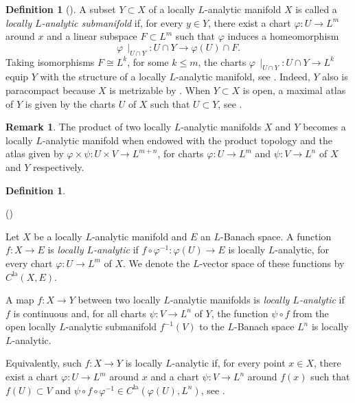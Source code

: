 \documentclass[a4paper, reqno, 10pt]{amsart}
\theoremstyle{definition}
\newtheorem{definition}[theorem]{Definition}
\newtheorem{remark}[theorem]{Remark}
\newenvironment{altenumerate}
	{\begin{list}
		{\textup{(\theenumi)} }
		{\usecounter{enumi}
			\setlength{\labelwidth}{0pt}
			\setlength{\labelsep}{0pt}
			\setlength{\leftmargin}{0pt}
			\setlength{\itemsep}{0pt}
			\setlength{\topsep}{0pt}
		\renewcommand{\theenumi}{\roman{enumi}}
		}}
	{\end{list}}
\numberwithin{equation}{section}
\newcommand{\la}{{\mathrm{la}}}
\newcommand{\lra}{\longrightarrow}
\newcommand{\ra}{\rightarrow}
\newcommand{\res}[1]{{\!\,\mid_{#1}}}
\begin{document}
\begin{definition}[{\cite[5.8.3]{Bourbaki07VarDiffAnFasciDeResult}}]\label{Def 1 - Submanifolds}
	A subset $Y \subset X$ of a locally $L$-analytic manifold $X$ is called a \textit{locally $L$-analytic submanifold} if, for every $y\in Y$, there exist a chart $\varphi \colon U \ra L^m$ around $x$ and a linear subspace $F \subset L^m$ such that $\varphi$ induces a homeomorphism 
	\begin{equation*}
		\varphi\res{U\cap Y} \colon U \cap Y \lra \varphi(U) \cap F.
	\end{equation*}
	Taking isomorphisms $F \cong L^k$, for some $k\leq m$, the charts $\varphi\res{U\cap Y} \colon U \cap Y \ra L^k$ equip $Y$ with the structure of a locally $L$-analytic manifold, see \cite[5.8.1]{Bourbaki07VarDiffAnFasciDeResult}.
	Indeed, $Y$ also is paracompact because $X$ is metrizable by \cite[Prop.\ 8.7]{Schneider11pAdicLieGrps}.
	When $Y \subset X$ is open, a maximal atlas of $Y$ is given by the charts $U$ of $X$ such that $U \subset Y$, see \cite[p.\ 48]{Schneider11pAdicLieGrps}.
\end{definition}



\begin{remark}
	The product of two locally $L$-analytic manifolds $X$ and $Y$ becomes a locally $L$-analytic manifold when endowed with the product topology and the atlas given by $\varphi \times \psi \colon U \times V \ra L^{m+n}$, for charts $\varphi\colon U \ra L^m$ and $\psi \colon V \ra L^n$ of $X$ and $Y$ respectively.
\end{remark}




\begin{definition}\label{Def 1 - Locally analytic maps between locally analytic manifolds}
	\begin{altenumerate}
		\item
		Let $X$ be a locally $L$-analytic manifold and $E$ an $L$-Banach space.
		A function $f\colon X \ra E$ is \textit{locally $L$-analytic} if $f\circ \varphi^{-1}\colon \varphi(U)\ra E$ is locally $L$-analytic, for every chart $\varphi\colon U \ra L^m$ of $X$.
		We denote the $L$-vector space of these functions by $C^\la(X,E)$.
		\item
		A map $f\colon X \ra Y$ between two locally $L$-analytic manifolds is \textit{locally $L$-analytic} if $f$ is continuous and, for all charts $\psi\colon V \ra L^n$ of $Y$, the function $\psi\circ f$ from the open locally $L$-analytic submanifold $f^{-1}(V)$ to the $L$-Banach space $L^n$ is locally $L$-analytic.
		
		Equivalently, such $f\colon X \ra Y$ is locally $L$-analytic if, for every point $x\in X$, there exist a chart $\varphi \colon U \ra L^m$ around $x$ and a chart $\psi \colon V \ra L^n$ around $f(x)$ such that $f(U) \subset V$ and $\psi \circ f \circ \varphi^{-1} \in C^\la(\varphi(U),L^n)$, see \cite[Lemma 8.3]{Schneider11pAdicLieGrps}.
	\end{altenumerate}
\end{definition}
\end{document}
